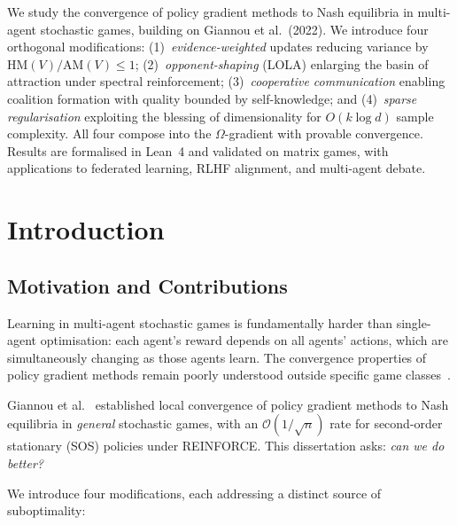 \documentclass[a4paper,oneside,11pt]{report}
\begin{document}
\dissertationtitlepage

\begin{dissertationsummary}
We study the convergence of policy gradient methods to Nash equilibria in multi-agent stochastic games, building on Giannou et al.\ (2022). We introduce four orthogonal modifications: (1)~\emph{evidence-weighted} updates reducing variance by $\mathrm{HM}(V)/\mathrm{AM}(V) \leq 1$; (2)~\emph{opponent-shaping} (LOLA) enlarging the basin of attraction under spectral reinforcement; (3)~\emph{cooperative communication} enabling coalition formation with quality bounded by self-knowledge; and (4)~\emph{sparse regularisation} exploiting the blessing of dimensionality for $O(k \log d)$ sample complexity. All four compose into the $\Omega$-gradient with provable convergence. Results are formalised in Lean~4 and validated on matrix games, with applications to federated learning, RLHF alignment, and multi-agent debate.
\end{dissertationsummary}

\dissertationtableofcontents

\chapter{Introduction}
\label{ch:introduction}

\section{Motivation and Contributions}

Learning in multi-agent stochastic games is fundamentally harder than single-agent optimisation: each agent's reward depends on all agents' actions, which are simultaneously changing as those agents learn. The convergence properties of policy gradient methods remain poorly understood outside specific game classes~\cite{giannou2022}.

Giannou et al.~\cite{giannou2022} established local convergence of policy gradient methods to Nash equilibria in \emph{general} stochastic games, with an $\mathcal{O}(1/\sqrt{n})$ rate for second-order stationary (SOS) policies under REINFORCE. This dissertation asks: \emph{can we do better?}

We introduce four modifications, each addressing a distinct source of suboptimality:
\end{document}
